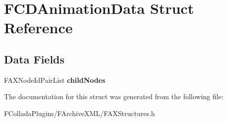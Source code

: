 \hypertarget{structFCDAnimationData}{
\section{FCDAnimationData Struct Reference}
\label{structFCDAnimationData}
}
\subsection*{Data Fields}
\begin{DoxyCompactItemize}
\item 
\hypertarget{structFCDAnimationData_a2161163930f76b5f439f0192088616a8}{
FAXNodeIdPairList {\bfseries childNodes}}
\label{structFCDAnimationData_a2161163930f76b5f439f0192088616a8}

\end{DoxyCompactItemize}


The documentation for this struct was generated from the following file:\begin{DoxyCompactItemize}
\item 
FColladaPlugins/FArchiveXML/FAXStructures.h\end{DoxyCompactItemize}
